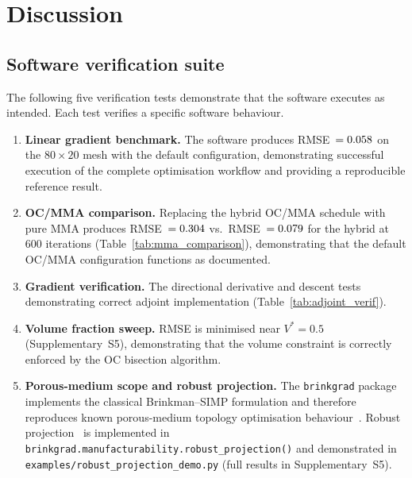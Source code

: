 \section{Discussion}
\label{sec:discussion}

\subsection{Software verification suite}
\label{sec:sw_verif_suite}

The following five verification tests demonstrate that the software
executes as intended.
Each test verifies a specific software behaviour.

\begin{enumerate}
    \item \textbf{Linear gradient benchmark.}
          The software produces RMSE~$=0.058$ on the
          $80\times20$ mesh with the default configuration,
          demonstrating successful execution of the complete
          optimisation workflow and providing a reproducible
          reference result.

    \item \textbf{OC/MMA comparison.}
          Replacing the hybrid OC/MMA schedule with pure MMA
          produces RMSE~$=0.304$ vs.\
          RMSE~$=0.079$ for the hybrid at 600 iterations
          (Table~\ref{tab:mma_comparison}),
          demonstrating that the default OC/MMA configuration
          functions as documented.

    \item \textbf{Gradient verification.}
          The directional derivative and descent tests
          demonstrating correct adjoint implementation
          (Table~\ref{tab:adjoint_verif}).

    \item \textbf{Volume fraction sweep.}
          RMSE is minimised near $V^*=0.5$
          (Supplementary~S5),
          demonstrating that the volume constraint is correctly
          enforced by the OC bisection algorithm.

    \item \textbf{Porous-medium scope and robust projection.}
          The \texttt{brinkgrad} package implements the
          classical Brinkman--SIMP formulation and therefore
          reproduces known porous-medium topology optimisation
          behaviour~\cite{borrvall2003}.
          Robust projection~\cite{wang2011} is implemented in
          \texttt{brinkgrad.manufacturability.robust\_projection()}
          and demonstrated in
          \texttt{examples/robust\_projection\_demo.py}
          (full results in Supplementary~S5).
\end{enumerate}

